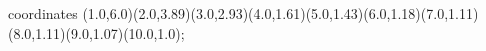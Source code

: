 					coordinates { (1.0,6.0)(2.0,3.89)(3.0,2.93)(4.0,1.61)(5.0,1.43)(6.0,1.18)(7.0,1.11)(8.0,1.11)(9.0,1.07)(10.0,1.0)};